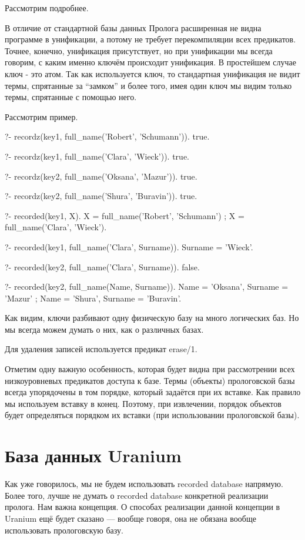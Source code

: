 \documentclass[a4paper]{book}
\def\ur{Uranium}
\begin{document}
Рассмотрим подробнее.

В отличие от стандартной базы данных Пролога расширенная не видна
программе в унификации, а потому не требует перекомпиляции всех
предикатов. Точнее, конечно, унификация присутствует, но при
унификации мы всегда говорим, с каким именно ключём происходит
унификация. В простейшем случае ключ - это атом. Так как
используется ключ, то стандартная унификация не видит термы,
спрятанные за ``замком'' и более того, имея один ключ мы видим
только термы, спрятанные с помощью него.

Рассмотрим пример.

\begin{example}{}{}
?- recordz(key1, full_name('Robert', 'Schumann')).
true.

?- recordz(key1, full_name('Clara', 'Wieck')).
true.

?- recordz(key2, full_name('Oksana', 'Mazur')).
true.

?- recordz(key2, full_name('Shura', 'Buravin')).
true.

?- recorded(key1, X).
X = full_name('Robert', 'Schumann') ;
X = full_name('Clara', 'Wieck').

?- recorded(key1, full_name('Clara', Surname)).
Surname = 'Wieck'.

?- recorded(key2, full_name('Clara', Surname)).
false.

?- recorded(key2, full_name(Name, Surname)).
Name = 'Oksana',
Surname = 'Mazur' ;
Name = 'Shura',
Surname = 'Buravin'.
\end{example}

Как видим, ключи разбивают одну физическую базу на много
логических баз. Но мы всегда можем думать о них, как о различных
базах.

Для удаления записей используется предикат erase/1.

Отметим одну важную особенность, которая будет видна при
рассмотрении всех низкоуровневых предикатов доступа к базе. Термы
(объекты) прологовской базы всегда упорядочены в том порядке,
который задаётся при их вставке. Как правило мы используем
вставку в конец. Поэтому, при извлечении, порядок объектов будет
определяться порядком их вставки (при использовании прологовской
базы).

\section{База данных \ur}

Как уже говорилось, мы не будем использовать recorded database
напрямую. Более того, лучше не думать о recorded database
конкретной реализации пролога. Нам важна концепция. О способах
реализации данной концепции в \ur{} ещё будет сказано --- вообще
говоря, она не обязана вообще использовать прологовскую базу.
\end{document}
